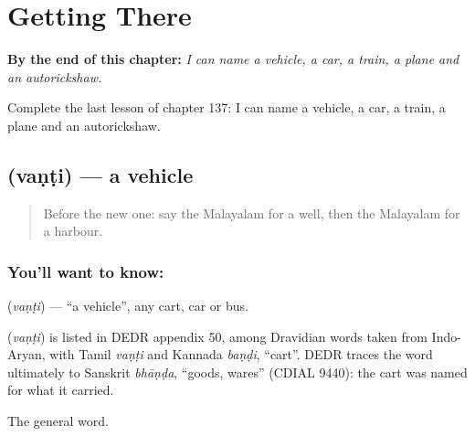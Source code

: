 
\chapter{Getting There}
\label{ch:ml-getting-there}

\begin{chapteropening}
\textbf{By the end of this chapter:} \emph{I can name a vehicle, a car, a train, a plane and an autorickshaw.}

Complete the last lesson of chapter 137: I can name a vehicle, a car, a train, a plane and an autorickshaw.
\end{chapteropening}

\section[\texorpdfstring{\ml{വണ്ടി} (vaṇṭi)}{വണ്ടി (vaṇṭi)}]{ (vaṇṭi) — a vehicle}

\label{lesson:ML-C137-vehicle}



\begin{quote}
Before the new one: say the Malayalam for a well, then the Malayalam for a harbour.
\end{quote}

\subsection*{You'll want to know: }
\textbf{} (\emph{vaṇṭi}) — \textquotedblleft{}a vehicle\textquotedblright{}, any cart, car or bus.

\begin{cousinweb}
\textbf{} (\emph{vaṇṭi}) is listed in DEDR appendix 50, among Dravidian words taken from Indo-Aryan, with Tamil \emph{vaṇṭi} and Kannada \emph{baṇḍi}, \textquotedblleft{}cart\textquotedblright{}. DEDR traces the word ultimately to Sanskrit \emph{bhāṇḍa}, \textquotedblleft{}goods, wares\textquotedblright{} (CDIAL 9440): the cart was named for what it carried.
\end{cousinweb}

\begin{grammarlens}[title={What you've built}]
The general word.
\end{grammarlens}

